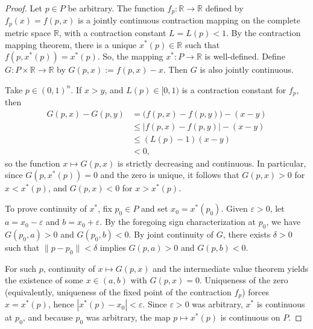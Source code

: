 \documentclass[10pt,a4paper]{amsart}
\begin{document}
\begin{proof}
Let $p \in P$ be arbitrary. The function $f_p: \mathbb{R} \to \mathbb{R}$ defined by $f_p(x) = f(p, x)$ is a jointly continuous contraction mapping on the complete metric space $\mathbb{R}$, with a contraction constant $L=L(p) < 1$. By the contraction mapping theorem, there is a unique $x^*(p) \in \mathbb{R}$ such that $f(p, x^*(p)) = x^*(p)$. So, the mapping $x^*: P \to \mathbb{R}$ is well-defined.
Define $G:P\times\mathbb R\to\mathbb R$ by $G(p,x):=f(p,x)-x$. Then $G$ is also jointly continuous.

Take $p\in(0,1)^n$. If $x>y$, and $L(p)\in[0,1)$ is a contraction constant for $f_p$, then
\begin{align*}
G(p,x)-G(p,y)
&=\bigl(f(p,x)-f(p,y)\bigr)-(x-y)\\
&\le |f(p,x)-f(p,y)|-(x-y)\\
&\le (L(p)-1)(x-y)\\
&<0,
\end{align*}
so the function $x\mapsto G(p,x)$ is strictly decreasing and continuous. In particular, since $G(p,x^*(p))=0$ and the zero is unique, it follows that $G(p,x)>0$ for $x<x^*(p)$, and $G(p,x)<0$ for $x>x^*(p)$.

To prove continuity of $x^*$, fix $p_0\in P$ and set $x_0=x^*(p_0)$. Given $\varepsilon>0$, let $a = x_0-\varepsilon$ and $b=x_0+\varepsilon$. By the foregoing sign characterization at $p_0$, we have $G(p_0,a)>0$ and $G(p_0,b)<0$. By joint continuity of $G$, there exists $\delta>0$ such that $\|p-p_0\|<\delta$ implies $G(p,a)>0$ and $G(p,b)<0$.

For such $p$, continuity of $x\mapsto G(p,x)$ and the intermediate value theorem yields the existence of some $x\in(a,b)$ with $G(p,x)=0$. Uniqueness of the zero (equivalently, uniqueness of the fixed point of the contraction $f_p$) forces $x=x^*(p)$, hence $|x^*(p)-x_0|<\varepsilon$. Since $\varepsilon>0$ was arbitrary, $x^*$ is continuous at $p_0$, and because $p_0$ was arbitrary, the map $p\mapsto x^*(p)$ is continuous on $P$.
\end{proof}
\end{document}
